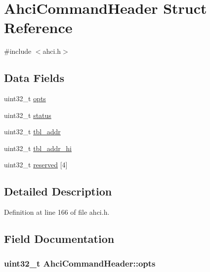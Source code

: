 \hypertarget{structAhciCommandHeader}{}\section{Ahci\+Command\+Header Struct Reference}
\label{structAhciCommandHeader}


{\ttfamily \#include $<$ahci.\+h$>$}

\subsection*{Data Fields}
\begin{DoxyCompactItemize}
\item 
uint32\+\_\+t \hyperlink{structAhciCommandHeader_a262106d4145e1d9fb8574b141dfac452}{opts}
\item 
uint32\+\_\+t \hyperlink{structAhciCommandHeader_aaeb18d131010effc76b3f40a9c06851a}{status}
\item 
uint32\+\_\+t \hyperlink{structAhciCommandHeader_a9a0af3edb5552ae52039b7f6f9f74abc}{tbl\+\_\+addr}
\item 
uint32\+\_\+t \hyperlink{structAhciCommandHeader_a92b0f59b1f834422312f180691c76a2e}{tbl\+\_\+addr\+\_\+hi}
\item 
uint32\+\_\+t \hyperlink{structAhciCommandHeader_ab20b140ede005b7d17cc59d961ba2976}{reserved} \mbox{[}4\mbox{]}
\end{DoxyCompactItemize}


\subsection{Detailed Description}


Definition at line 166 of file ahci.\+h.



\subsection{Field Documentation}
\subsubsection[{\texorpdfstring{opts}{opts}}]{\setlength{\rightskip}{0pt plus 5cm}uint32\+\_\+t Ahci\+Command\+Header\+::opts}\hypertarget{structAhciCommandHeader_a262106d4145e1d9fb8574b141dfac452}{}\label{structAhciCommandHeader_a262106d4145e1d9fb8574b141dfac452}


